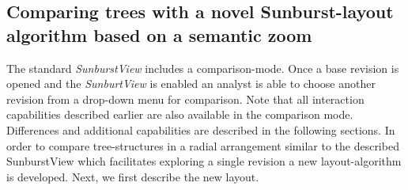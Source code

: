 \subsection{Comparing trees with a novel Sunburst-layout algorithm based on a semantic zoom}\label{subsec::comparison}
The standard \emph{SunburstView} includes a comparison-mode. Once a base revision is opened and the \emph{SunburtView} is enabled an analyst is able to choose another revision from a drop-down menu for comparison. Note that all interaction capabilities described earlier are also available in the comparison mode. Differences and additional capabilities are described in the following sections. In order to compare tree-structures in a radial arrangement similar to the described SunburstView which facilitates exploring a single revision a new layout-algorithm is developed. Next, we first describe the new layout.

